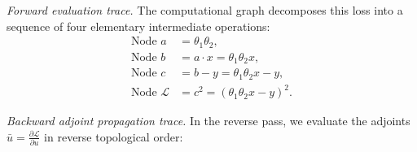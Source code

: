 \documentclass[../../../main.tex]{subfiles}
\begin{document}
\textit{Forward evaluation trace.} The computational graph decomposes this loss into a sequence of four elementary intermediate operations:
\begin{align}
\text{Node } a &= \theta_1 \theta_2, \label{eq:trace_fwd_a} \\
\text{Node } b &= a \cdot x = \theta_1 \theta_2 x, \label{eq:trace_fwd_b} \\
\text{Node } c &= b - y = \theta_1 \theta_2 x - y, \label{eq:trace_fwd_c} \\
\text{Node } \mathcal{L} &= c^2 = \left( \theta_1 \theta_2 x - y \right)^2. \label{eq:trace_fwd_L}
\end{align}

\textit{Backward adjoint propagation trace.} In the reverse pass, we evaluate the adjoints $\bar{u} = \frac{\partial \mathcal{L}}{\partial u}$ in reverse topological order:
\end{document}
